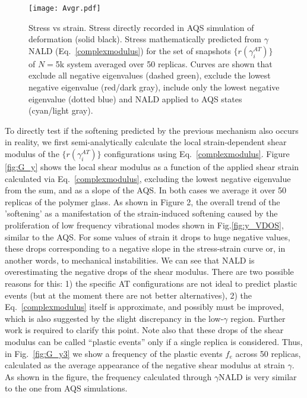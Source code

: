 \documentclass[pre,twocolumn,aps,superscriptaddress,showpacs]{revtex4-1}
\begin{document}
\begin{figure}
  \centering
\texttt{[image: Avgr.pdf]}
\caption{Stress vs strain. Stress directly recorded in AQS simulation of deformation (solid black). Stress mathematically predicted from $\gamma$NALD (Eq.~\ref{complexmodulus}) for the set of snapshots $\{r(\gamma^{AT}_i)\}$ of $N=$5k system averaged over 50 replicas. Curves are shown that exclude all negative eigenvalues (dashed green), exclude the lowest negative eigenvalue (red/dark gray), include only the lowest negative eigenvalue (dotted blue) and NALD applied to AQS states (cyan/light gray). }
\label{fig:StressStrain}
\end{figure}

To directly test if the softening predicted by the previous mechanism also occurs in reality, we first semi-analytically calculate the local strain-dependent shear modulus of the $\{r(\gamma^{AT}_i)\}$ configurations using Eq.~\ref{complexmodulus}. Figure \ref{fig:G_y} shows the local shear modulus as a function of the applied shear strain calculated via Eq.~\ref{complexmodulus}, excluding the lowest negative eigenvalue from the sum, and as a slope of the AQS. In both cases we average it over 50 replicas of the polymer glass. As shown in Figure 2, the overall trend of the 'softening' as a manifestation of the strain-induced softening caused by the proliferation of low frequency vibrational modes shown in Fig.\ref{fig:y_VDOS}, similar to the AQS. For some values of strain it drops to  huge negative values, these drops corresponding to a negative slope in the stress-strain curve or, in another words, to mechanical instabilities. We can see that NALD is overestimating the negative drops of the shear modulus. There are two possible reasons for this: 1) the specific AT configurations are not ideal to predict plastic events (but at the moment there are not better alternatives), 2) the Eq.~\ref{complexmodulus} itself is approximate, and possibly must be improved, which is also suggested by the slight discrepancy in the low-$\gamma$ region. Further work is required to clarify this point. 
Note also that these drops of the shear modulus can be called ``plastic events'' only if a single replica is considered. Thus, in Fig.~\ref{fig:G_y3} we show a frequency of the plastic events $f_e$ across 50 replicas, calculated as the average appearance of the negative shear modulus at strain $\gamma$. As shown in the figure, the frequency calculated through $\gamma$NALD is very similar to the one from AQS simulations. 
\end{document}

